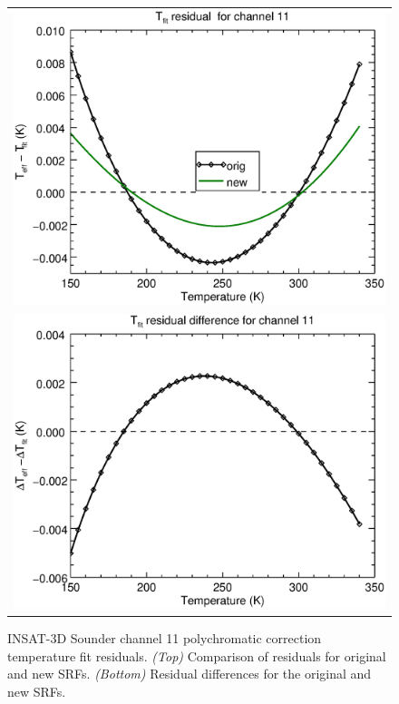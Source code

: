 \begin{figure}[H]
  \centering
  \begin{tabular}{c}
    \includegraphics[scale=0.55]{graphics/sndr/tfit/sndr_insat3d-11.tfit.eps} \\
    \includegraphics[scale=0.55]{graphics/sndr/tfit/sndr_insat3d-11.tfit.difference.eps}
  \end{tabular}
  \caption{INSAT-3D Sounder channel 11 polychromatic correction temperature fit residuals. \emph{(Top)} Comparison of residuals for original and new SRFs. \emph{(Bottom)} Residual differences for the original and new SRFs.}
  \label{fig:sndr_ch11_tfit}
\end{figure}



